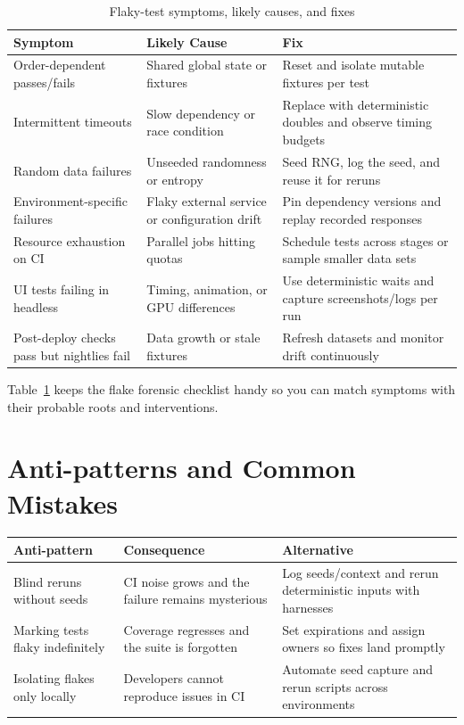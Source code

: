 \begin{table}[h]
\centering
\caption{Flaky-test symptoms, likely causes, and fixes}
\label{tab:flaky-symptoms}
\begin{tabular}{p{4cm}p{4cm}p{5cm}}
\toprule
Symptom & Likely Cause & Fix \\
\midrule
Order-dependent passes/fails & Shared global state or fixtures & Reset and isolate mutable fixtures per test \\
Intermittent timeouts & Slow dependency or race condition & Replace with deterministic doubles and observe timing budgets \\
Random data failures & Unseeded randomness or entropy & Seed RNG, log the seed, and reuse it for reruns \\
Environment-specific failures & Flaky external service or configuration drift & Pin dependency versions and replay recorded responses \\
Resource exhaustion on CI & Parallel jobs hitting quotas & Schedule tests across stages or sample smaller data sets \\
UI tests failing in headless & Timing, animation, or GPU differences & Use deterministic waits and capture screenshots/logs per run \\
Post-deploy checks pass but nightlies fail & Data growth or stale fixtures & Refresh datasets and monitor drift continuously \\
\bottomrule
\end{tabular}
\end{table}

Table~\ref{tab:flaky-symptoms} keeps the flake forensic checklist handy so you can match symptoms with their probable roots and interventions.

\section{Anti-patterns and Common Mistakes}
\begin{tabular}{p{4.5cm}p{4.5cm}p{4.5cm}}
\toprule
Anti-pattern & Consequence & Alternative \\
\midrule
Blind reruns without seeds & CI noise grows and the failure remains mysterious & Log seeds/context and rerun deterministic inputs with harnesses \\
Marking tests flaky indefinitely & Coverage regresses and the suite is forgotten & Set expirations and assign owners so fixes land promptly \\
Isolating flakes only locally & Developers cannot reproduce issues in CI & Automate seed capture and rerun scripts across environments \\
\bottomrule
\end{tabular}

